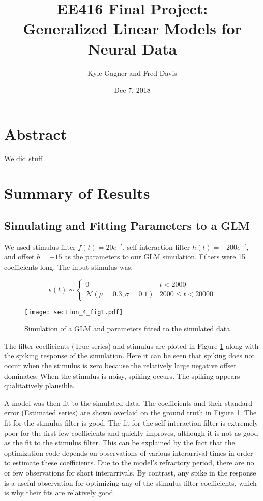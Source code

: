 \documentclass[letterpaper,titlepage,10pt]{article}
\title{EE416 Final Project:\\Generalized Linear Models for Neural Data}
\date{Dec 7, 2018}
\author{Kyle Gagner and Fred Davis}
\begin{document}
\maketitle
\section{Abstract}
We did stuff
\section{Summary of Results}

\subsection{Simulating and Fitting Parameters to a GLM}

We used stimulus filter $f(t)=20e^{-t}$, self interaction filter $h(t)=-200e^{-t}$, and offset $b=-15$ as the
parameters to our GLM simulation. Filters were 15 coefficients long. The input stimulus was:

$$s(t)\sim
\begin{cases}
0 & t < 2000\\
\mathcal{N}(\mu=0.3, \sigma=0.1) & 2000 \leq t < 20000
\end{cases}$$

\begin{figure}[h]
\texttt{[image: section\_4\_fig1.pdf]}
\caption{Simulation of a GLM and parameters fitted to the simulated data}
\label{fig_simulation}
\end{figure}

The filter coefficients (True series) and stimulus are ploted in Figure \ref{fig_simulation} along with the spiking
response of the simulation. Here it can be seen that spiking does not occur when the stimulus is zero because the
relatively large negative offset dominates. When the stimulus is noisy, spiking occurs. The spiking appears
qualitatively plausible.

A model was then fit to the simulated data. The coefficients and their standard error (Estimated series) are shown
overlaid on the ground truth in Figure \ref{fig_simulation}. The fit for the stimulus filter is good. The fit for the
self interaction filter is extremely poor for the first few coefficients and quickly improves, although it is not as
good as the fit to the stimulus filter. This can be explained by the fact that the optimization code depends on
observations of various interarrival times in order to estimate these coefficients. Due to the model's refractory
period, there are no or few observations for short interarrivals. By contrast, any spike in the response is a useful
observation for optimizing any of the stimulus filter coefficients, which is why their fits are relatively good.
\end{document}
